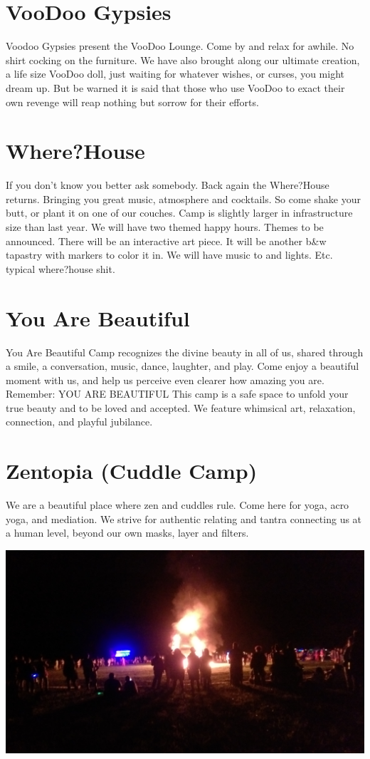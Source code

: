 \begin{multicols}{2}
\section*{VooDoo Gypsies}
Voodoo Gypsies present the VooDoo Lounge. Come by and relax for awhile. No shirt cocking on the furniture. We have also brought along our ultimate creation, a life size VooDoo doll, just waiting for whatever wishes, or curses, you might dream up. But be warned it is said that those who use VooDoo to exact their own revenge will reap nothing but sorrow for their efforts.


\section*{Where?House}
If you don’t know you better ask somebody. Back again the Where?House returns. Bringing you great music, atmosphere and cocktails. So come shake your butt, or plant it on one of our couches. Camp is slightly larger in infrastructure size than last year. We will have two themed happy hours. Themes to be announced. There will be an interactive art piece. It will be another b\&w tapastry with markers to color it in. We will have music to and lights. Etc. typical where?house shit.


\section*{You Are Beautiful}
You Are Beautiful Camp recognizes the divine beauty in all of us, shared through a smile, a conversation, music, dance, laughter, and play. Come enjoy a beautiful moment with us, and help us perceive even clearer how amazing you are. Remember: YOU ARE BEAUTIFUL This camp is a safe space to unfold your true beauty and to be loved and accepted. We feature whimsical art, relaxation, connection, and playful jubilance.




\section*{Zentopia (Cuddle Camp)}
We are a beautiful place where zen and cuddles rule. Come here for yoga, acro yoga, and mediation. We strive for authentic relating and tantra connecting us at a human level, beyond our own masks, layer and filters.
\end{multicols}


\vspace*{\fill}
\begin{center}
	\includegraphics[width=.9\textwidth]{images/TTM2017EffigyBurn}
    \label{image:2017effigyburn}
\end{center}
\vspace*{\fill}




